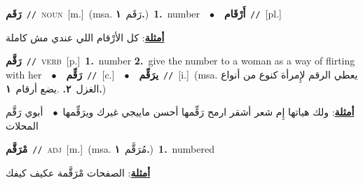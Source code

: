\documentclass[10pt,a4paper,twoside]{article} %
\begin{document}
\begin{multicols}{2}
{\setlength\topsep{0pt}\textbf{\foreignlanguage{arabic}{رَقَم}}\ {\color{gray}\texttt{//}\color{black}}\ \textsc{noun}\ [m.]\ \color{gray}(msa. \foreignlanguage{arabic}{رَقَم}~\foreignlanguage{arabic}{\textbf{١.}})\color{black}\ \textbf{1.}~number\ \ $\bullet$\ \ \setlength\topsep{0pt}\textbf{\foreignlanguage{arabic}{أَرْقَام}}\ {\color{gray}\texttt{//}\color{black}}\ [pl.]\  \begin{flushright}\color{gray}\foreignlanguage{arabic}{\textbf{\underline{\foreignlanguage{arabic}{أمثلة}}}: كل الأرْقام اللي عندي مش كاملة}\end{flushright}\color{black}} \vspace{2mm}

{\setlength\topsep{0pt}\textbf{\foreignlanguage{arabic}{رَقَّم}}\ {\color{gray}\texttt{//}\color{black}}\ \textsc{verb}\ [p.]\ \textbf{1.}~number  \textbf{2.}~give the number to a woman as a way of flirting with her\ \ $\bullet$\ \ \setlength\topsep{0pt}\textbf{\foreignlanguage{arabic}{رَقِّم}}\ {\color{gray}\texttt{//}\color{black}}\ [c.]\ \ $\bullet$\ \ \setlength\topsep{0pt}\textbf{\foreignlanguage{arabic}{يرَقِّم}}\ {\color{gray}\texttt{//}\color{black}}\ [i.]\ \color{gray}(msa. \foreignlanguage{arabic}{يعطي الرقم لإِمرأة كنوع من أنواع الغزل}~\foreignlanguage{arabic}{\textbf{٢.}}  .\foreignlanguage{arabic}{يضع أرقام}~\foreignlanguage{arabic}{\textbf{١.}})\color{black}\  \begin{flushright}\color{gray}\foreignlanguage{arabic}{\textbf{\underline{\foreignlanguage{arabic}{أمثلة}}}: ولك هياتها إِم شعر أشقر ارمح رَقِّمها أحسن ماييجي غيرك ويرَقِّمها\ $\bullet$\ \  أبوي رَقَّم المحلات}\end{flushright}\color{black}} \vspace{2mm}

{\setlength\topsep{0pt}\textbf{\foreignlanguage{arabic}{مْرَقَّم}}\ {\color{gray}\texttt{//}\color{black}}\ \textsc{adj}\ [m.]\ \color{gray}(msa. \foreignlanguage{arabic}{مُرَقَّم}~\foreignlanguage{arabic}{\textbf{١.}})\color{black}\ \textbf{1.}~numbered\  \begin{flushright}\color{gray}\foreignlanguage{arabic}{\textbf{\underline{\foreignlanguage{arabic}{أمثلة}}}: الصفحات مْرَقَّمة عكيف كيفك}\end{flushright}\color{black}} \vspace{2mm}


\end{multicols}
\end{document}
